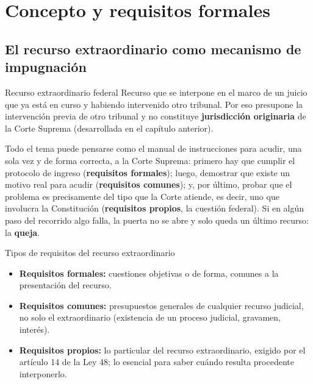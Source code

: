 \documentclass[12pt,oneside]{book}
\begin{document}
\chapter{Concepto y requisitos formales}

\section{El recurso extraordinario como mecanismo de impugnación}

\begin{definition}{Recurso extraordinario federal}
Recurso que se interpone en el marco de un juicio que ya está en curso y habiendo intervenido otro tribunal. Por eso presupone la intervención previa de otro tribunal y no constituye \textbf{jurisdicción originaria} de la Corte Suprema (desarrollada en el capítulo anterior).
\end{definition}

Todo el tema puede pensarse como el manual de instrucciones para acudir, una sola vez y de forma correcta, a la Corte Suprema: primero hay que cumplir el protocolo de ingreso (\textbf{requisitos formales}); luego, demostrar que existe un motivo real para acudir (\textbf{requisitos comunes}); y, por último, probar que el problema es precisamente del tipo que la Corte atiende, es decir, uno que involucra la Constitución (\textbf{requisitos propios}, la cuestión federal). Si en algún paso del recorrido algo falla, la puerta no se abre y solo queda un último recurso: la \textbf{queja}.

\begin{definition}{Tipos de requisitos del recurso extraordinario}
\begin{itemize}
    \item \textbf{Requisitos formales:} cuestiones objetivas o de forma, comunes a la presentación del recurso.
    \item \textbf{Requisitos comunes:} presupuestos generales de cualquier recurso judicial, no solo el extraordinario (existencia de un proceso judicial, gravamen, interés).
    \item \textbf{Requisitos propios:} lo particular del recurso extraordinario, exigido por el artículo 14 de la Ley 48; lo esencial para saber cuándo resulta procedente interponerlo.
\end{itemize}
\end{definition}
\end{document}
